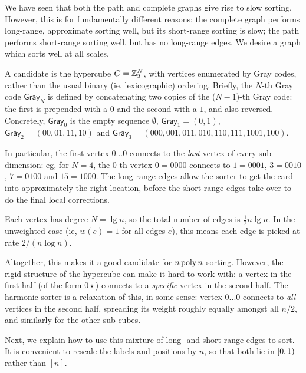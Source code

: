 \documentclass{article}
\begin{document}
\begin{Proof}[Intuition]
\qedtriangle
We have seen that both the path and complete graphs give rise to slow sorting. However, this is for fundamentally different reasons:
	the complete graph performs long-range, approximate sorting well,
	but its short-range sorting is slow;
	the path performs short-range sorting well,
	but has no long-range edges.
We desire a graph which sorts well at all scales.

A candidate is the hypercube $G = \mathbb{Z}_2^N$, with vertices enumerated by Gray codes, rather than the usual binary (ie, lexicographic) ordering.
Briefly, the $N$-th Gray code $\mathsf{Gray}_N$ is defined by concatenating two copies of the ($N-1$)-th Gray code:
	the first is prepended with a $0$
and
	the second with a $1$, and also reversed.
%
Concretely,
	$\mathsf{Gray}_0$ is the empty sequence $\emptyset$,
	$\mathsf{Gray}_1 = (0, 1)$,
	$\mathsf{Gray}_2 = (00, 01, 11, 10)$
and
	$\mathsf{Gray}_3 = (000, 001, 011, 010, 110, 111, 1001, 100)$.

In particular, the first vertex $0...0$ connects to the \emph{last} vertex of every sub-dimension: eg, for $N = 4$, the 0-th vertex $0 = 0000$ connects to $1 = 0001$, $3 = 0010$, $7 = 0100$ and $15 = 1000$.
The long-range edges allow the sorter to get the card into approximately the right location, before the short-range edges take over to do the final local corrections.

Each vertex has degree $N = \lg n$, so the total number of edges is $\tfrac12 n \lg n$. In the unweighted case (ie, $w(e) = 1$ for all edges $e$), this means each edge is picked at rate $2/(n \log n)$.

Altogether, this makes it a good candidate for $n \operatorname{poly} n$ sorting.
However, the rigid structure of the hypercube can make it hard to work with: a vertex in the first half (of the form $0\star$) connects to a \emph{specific} vertex in the second half.
The harmonic sorter is a relaxation of this, in some sense:
	vertex $0...0$ connects to \emph{all} vertices in the second half,
	spreading its weight roughly equally amongst all $n/2$,
	and similarly for the other sub-cubes.
\end{Proof}

Next, we explain how to use this mixture of long- and short-range edges to sort.
It is convenient to rescale the labels and positions by $n$, so that both lie in $[0,1)$ rather than $[n]$.
\end{document}

